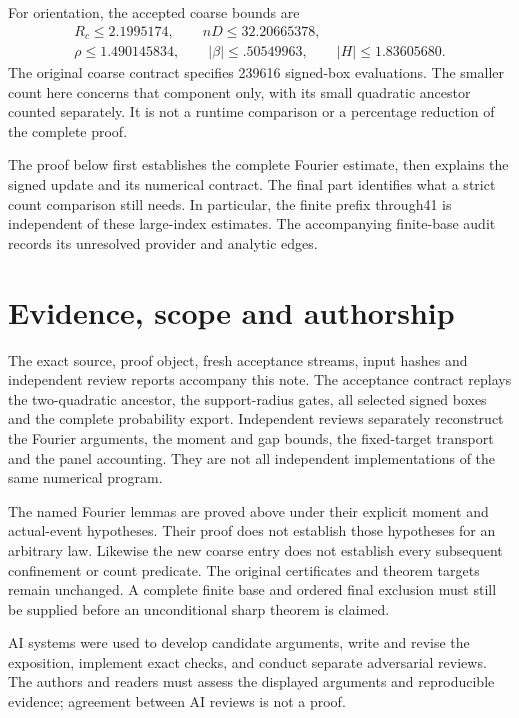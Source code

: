 \documentclass[11pt,a4paper]{article}
\begin{document}
For orientation, the accepted coarse bounds are
\begin{gather*}
 R_c\le2.1995174,\qquad nD\le32.20665378,\\
 \rho\le1.490145834,\qquad|\beta|\le .50549963,\qquad |H|\le1.83605680 .
\end{gather*}
The original coarse contract specifies 239616 signed-box evaluations.
The smaller count here concerns that component only, with its small
quadratic ancestor counted separately. It is not a runtime comparison
or a percentage reduction of the complete proof.

The proof below first establishes the complete Fourier estimate, then
explains the signed update and its numerical contract. The final part
identifies what a strict count comparison still needs. In particular,
the finite prefix through41 is independent of these large-index
estimates. The accompanying finite-base audit records its unresolved
provider and analytic edges.





\section{Evidence, scope and authorship}
The exact source, proof object, fresh acceptance streams, input hashes
and independent review reports accompany this note. The acceptance
contract replays the two-quadratic ancestor, the support-radius gates,
all selected signed boxes and the complete probability export.
Independent reviews separately reconstruct the Fourier arguments,
the moment and gap bounds, the fixed-target transport and the panel
accounting. They are not all independent implementations of the
same numerical program.

The named Fourier lemmas are proved above under their explicit
moment and actual-event hypotheses. Their proof does not establish
those hypotheses for an arbitrary law. Likewise the new coarse
entry does not establish every subsequent confinement or count
predicate. The original certificates and theorem targets remain
unchanged. A complete finite base and ordered final exclusion must
still be supplied before an unconditional sharp theorem is claimed.

AI systems were used to develop candidate arguments, write and
revise the exposition, implement exact checks, and conduct separate
adversarial reviews. The authors and readers must assess the
displayed arguments and reproducible evidence; agreement between
AI reviews is not a proof.
\end{document}
